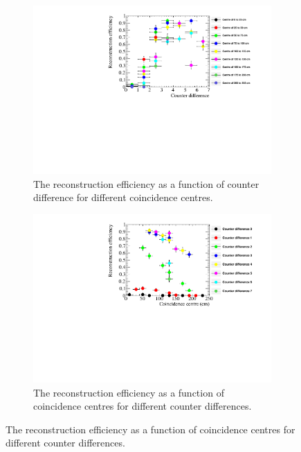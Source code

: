 \begin{figure}
  \centering
  \begin{subfigure}{0.65\textwidth}
    \centering
    \includegraphics[width=\textwidth]{AngleCanvas_50}
    \caption{The reconstruction efficiency as a function of counter difference for different coincidence centres.}
    \label{fig:AngleCanvas}
  \end{subfigure}
  \begin{subfigure}{0.65\textwidth}
    \centering
    \includegraphics[width=\textwidth]{DistanceCanvas_50}
    \caption{The reconstruction efficiency as a function of coincidence centres for different counter differences.}
    \label{fig:DistanceCanvas}
  \end{subfigure}


\end{figure}
